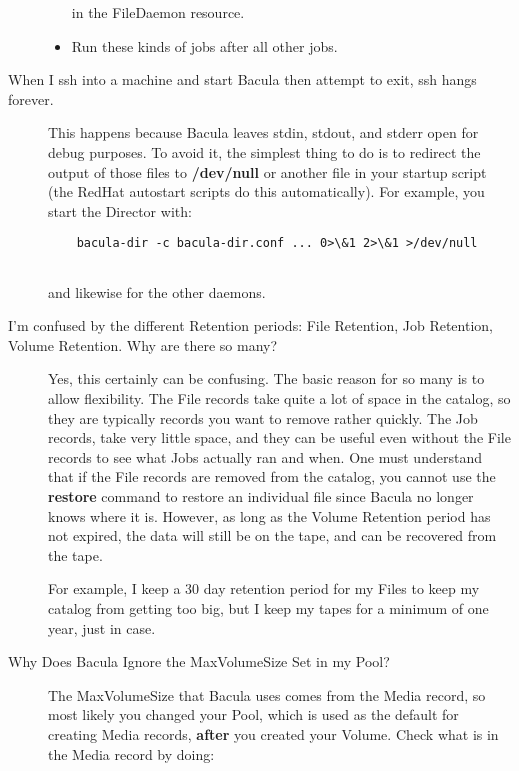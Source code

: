 \begin{description}
\begin{itemize}
in the FileDaemon resource.  
\item Run these kinds of jobs after all other jobs.  
   \end{itemize}

\label{sshHanging}
\item [When I ssh into a machine and start Bacula then attempt to exit, 
   ssh hangs forever.]
   This happens because Bacula leaves stdin, stdout, and stderr open  for debug
   purposes. To avoid it, the simplest thing to do is to  redirect the output of
   those files to {\bf /dev/null} or another  file in your startup script (the
   RedHat autostart scripts do this  automatically). For example, you start the
   Director with:  
   
\footnotesize
\begin{verbatim}
    bacula-dir -c bacula-dir.conf ... 0>\&1 2>\&1 >/dev/null
    
\end{verbatim}
\normalsize

and likewise for the other daemons.  

\label{RetentionPeriods}

\item [I'm confused by the different Retention periods: File Retention, 
   Job Retention, Volume Retention. Why are there so many?]
   Yes, this certainly can be confusing. The basic reason for so many  is to
   allow flexibility. The File records take quite a lot of space  in the catalog,
   so they are typically records you want to remove  rather quickly. The Job
   records, take very little space, and they  can be useful even without the File
   records to see what Jobs actually  ran and when. One must understand that if
   the File records are removed  from the catalog, you cannot use the {\bf
   restore} command to restore  an individual file since Bacula no longer knows
   where it is. However,  as long as the Volume Retention period has not expired,
   the data will  still be on the tape, and can be recovered from the tape.  
   
   For example, I keep a 30 day retention period for my Files to  keep my catalog
   from getting too big, but I keep my tapes for a  minimum of one year, just in
   case.  

\label{MaxVolumeSize}
\item [Why Does Bacula Ignore the MaxVolumeSize Set in my Pool?]
   The MaxVolumeSize that Bacula uses comes from the Media record,  so most
   likely you changed your Pool, which is used as the default  for creating Media
   records, {\bf after} you created your Volume. Check  what is in the Media
   record by doing: 


\end{description}
